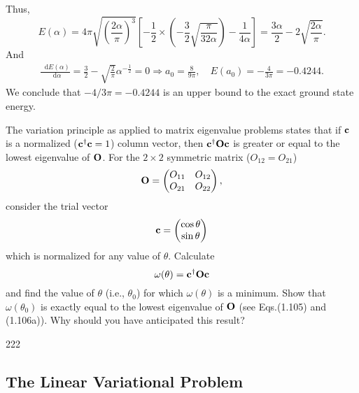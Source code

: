 \documentclass[a4paper]{book}
\newcounter{exercise}[chapter]
\newcounter{solution}[chapter]
\newcommand*{\dif}{\mathop{}\!\mathrm{d}}
\newcommand{\Op}{{\bf O}}
\begin{document}
\begin{solution}
	Thus,
	\[
		E( \alpha ) = 4\pi \sqrt{ \left( \frac{2\alpha}{\pi} \right)^3 } \left[ -\frac{1}{2} \times \left( - \frac{3}{2} \sqrt{ \frac{ \pi }{ 32 \alpha } } \right) - \frac{1}{4\alpha} \right] = \frac{ 3 \alpha }{ 2 } - 2 \sqrt{ \frac{ 2\alpha }{ \pi } } .
	\]
	And
	\begin{align*}
		\frac{ \dif E( \alpha ) }{ \dif \alpha } = \frac{3}{2} -  \sqrt{ \frac{2}{\pi} } \alpha^{-\frac{1}{2}} = 0 \Rightarrow a_0 = \frac{ 8 }{ 9\pi } , \quad E( a_0 ) = - \frac{4}{3\pi} = -0.4244 .
	\end{align*}
	We conclude that $-4/3\pi = -0.4244$ is an upper bound to the exact ground state energy.
	
	\end{solution}
	
	\begin{exercise}
	The variation principle as applied to matrix eigenvalue problems states that if ${\bf c}$ is a normalized (${\bf c}^\dagger {\bf c}=1$) column vector, then ${\bf c}^\dagger\Op{\bf c}$ is greater or equal to the lowest eigenvalue of $\Op$. For the $2\times2$ symmetric matrix ($O_{12}=O_{21}$)
	\[
		\Op = \begin{pmatrix} O_{11} & O_{12} \\ O_{21} & O_{22} \end{pmatrix},
	\]
	consider the trial vector
	\[
		{\bf c} = \begin{pmatrix} \cos\theta \\ \sin\theta \end{pmatrix}
	\]
	which is normalized for any value of $\theta$. Calculate
	\[
		\omega(\theta) = {\bf c}^\dagger \Op {\bf c}
	\]
	and find the value of $\theta$ (i.e., $\theta_0$) for which $\omega(\theta)$ is a minimum. Show that $\omega(\theta_0)$ is exactly equal to the lowest eigenvalue of $\Op$ (see Eqs.(1.105) and (1.106a)). Why should you have anticipated this result?
	\end{exercise}
	
	\begin{solution}
		222
	\end{solution}
	
	\subsection{The Linear Variational Problem}
	
\end{document}
